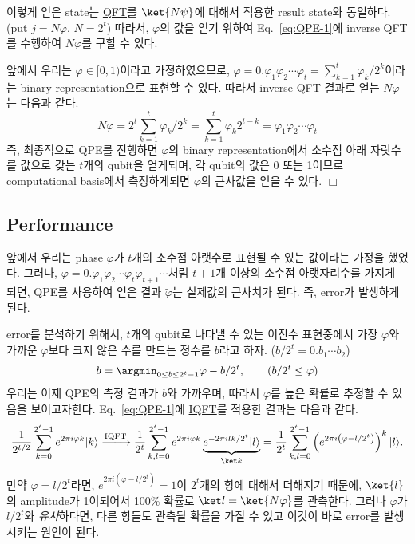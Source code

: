 이렇게 얻은 state는 \hyperref[def:QFT]{QFT}를 $ \ket{N \psi}$에 대해서 적용한 result state와 동일하다. (put $j = N\varphi$, $N=2^t$) 
따라서, $\varphi$의 값을 얻기 위하여 Eq.~\eqref{eq:QPE-1}에 inverse QFT를 수행하여 $N\varphi$를 구할 수 있다.

앞에서 우리는 $\varphi \in [0, 1)$이라고 가정하였으므로, $\varphi = 0.\varphi_1 \varphi_2 \cdots \varphi_t = \sum^t_{k=1} \varphi_k / 2^k$이라는 binary representation으로 표현할 수 있다. 
따라서 inverse QFT 결과로 얻는 $N\varphi$는 다음과 같다.
\begin{equation*}
  N\varphi = 2^t \sum^t_{k=1} \varphi_k / 2^k = \sum^t_{k=1} \varphi_k 2^{t-k} = \varphi_1\varphi_2 \cdots \varphi_t 
\end{equation*}
\newpage
즉, 최종적으로 QPE를 진행하면 $\varphi$의 binary representation에서 소수점 아래 자릿수를 값으로 갖는 $t$개의 qubit을 얻게되며, 각 qubit의 값은 0 또는 1이므로 computational basis에서 측정하게되면 $\varphi$의 근사값을 얻을 수 있다. $\Box$

\subsection{Performance}
앞에서 우리는 phase $\varphi$가 $t$개의 소수점 아랫수로 표현될 수 있는 값이라는 가정을 했었다.
그러나, $\varphi = 0.\varphi_1\varphi_2 \cdots \varphi_t \varphi_{t+1} \cdots$처럼 $t+1$개 이상의 소수점 아랫자리수를 가지게 되면, QPE를 사용하여 얻은 결과 $\tilde \varphi$는 실제값의 근사치가 된다. 즉, error가 발생하게 된다.

error를 분석하기 위해서, $t$개의 qubit로 나타낼 수 있는 이진수 표현중에서 가장 $\varphi$와 가까운 $\varphi$보다 크지 않은 수를 만드는 정수를 $b$라고 하자. ($b/2^t = 0.b_1 \cdots b_2$)
\begin{equation}
  b = \argmin_{0 \leq b \leq 2^t-1} \varphi - b / 2^t, \qquad (b/2^t \le \varphi) \label{eq:b}
\end{equation}
우리는 이제 QPE의 측정 결과가 $b$와 가까우며, 따라서 $\varphi$를 높은 확률로 추정할 수 있음을 보이고자한다.
Eq.~\eqref{eq:QPE-1}에 \hyperref[def:IQFT]{IQFT}를 적용한 결과는 다음과 같다.
\begin{equation*}
  \frac{1}{2^{t / 2}} \sum_{k=0}^{2^t-1} e^{2 \pi i \varphi k}|k\rangle \xrightarrow{\mathrm{IQFT}} \frac{1}{2^t} \sum_{k, l=0}^{2^t-1} e^{2 \pi i \varphi k} \underbrace{e^{-2 \pi i lk / 2^t} |l\rangle}_{\ket k} = \frac{1}{2^t} \sum_{k, l=0}^{2^t-1}\left(e^{2 \pi i\left(\varphi-l / 2^t\right)}\right)^k|l\rangle .
\end{equation*}
만약 $\varphi = l/2^t$라면, $e^{2\pi i(\varphi - l/2^t)} = 1$이 $2^t$개의 항에 대해서 더해지기 때문에, $\ket{l}$의 amplitude가 1이되어서 100\% 확률로 $\ket l = \ket{N\varphi}$를 관측한다. 그러나 $\varphi$가 $l/2^t$와 \textit{유사}하다면, 다른 항들도 관측될 확률을 가질 수 있고 이것이 바로 error를 발생시키는 원인이 된다.

